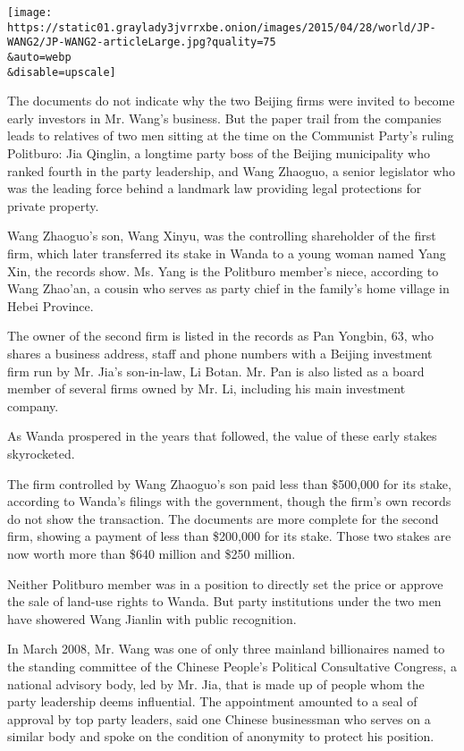 \texttt{[image: https://static01.graylady3jvrrxbe.onion/images/2015/04/28/world/JP-WANG2/JP-WANG2-articleLarge.jpg?quality=75\\\&auto=webp\\\&disable=upscale]}

The documents do not indicate why the two Beijing firms were invited to
become early investors in Mr. Wang's business. But the paper trail from
the companies leads to relatives of two men sitting at the time on the
Communist Party's ruling Politburo: Jia Qinglin, a longtime party boss
of the Beijing municipality who ranked fourth in the party leadership,
and Wang Zhaoguo, a senior legislator who was the leading force behind a
landmark law providing legal protections for private property.

Wang Zhaoguo's son, Wang Xinyu, was the controlling shareholder of the
first firm, which later transferred its stake in Wanda to a young woman
named Yang Xin, the records show. Ms. Yang is the Politburo member's
niece, according to Wang Zhao'an, a cousin who serves as party chief in
the family's home village in Hebei Province.

The owner of the second firm is listed in the records as Pan Yongbin,
63, who shares a business address, staff and phone numbers with a
Beijing investment firm run by Mr. Jia's son-in-law, Li Botan. Mr. Pan
is also listed as a board member of several firms owned by Mr. Li,
including his main investment company.

As Wanda prospered in the years that followed, the value of these early
stakes skyrocketed.

The firm controlled by Wang Zhaoguo's son paid less than \$500,000 for
its stake, according to Wanda's filings with the government, though the
firm's own records do not show the transaction. The documents are more
complete for the second firm, showing a payment of less than \$200,000
for its stake. Those two stakes are now worth more than \$640 million
and \$250 million.

Neither Politburo member was in a position to directly set the price or
approve the sale of land-use rights to Wanda. But party institutions
under the two men have showered Wang Jianlin with public recognition.

In March 2008, Mr. Wang was one of only three mainland billionaires
named to the standing committee of the Chinese People's Political
Consultative Congress, a national advisory body, led by Mr. Jia, that is
made up of people whom the party leadership deems influential. The
appointment amounted to a seal of approval by top party leaders, said
one Chinese businessman who serves on a similar body and spoke on the
condition of anonymity to protect his position.

